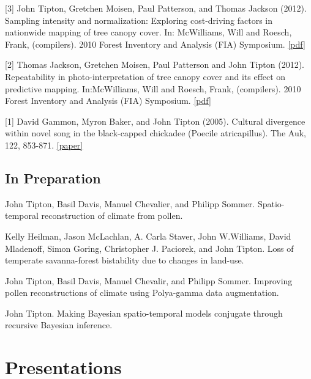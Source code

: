 \documentclass[11pt,]{article}
\renewenvironment{itemize}{
  \begin{list}{}{
    \setlength{\leftmargin}{1.5em}
  }
}{
  \end{list}
}
\begin{document}
\begin{itemize}
\item
  {[}3{]} John Tipton, Gretchen Moisen, Paul Patterson, and Thomas
  Jackson (2012). Sampling intensity and normalization: Exploring
  cost-driving factors in nationwide mapping of tree canopy cover. In:
  McWilliams, Will and Roesch, Frank, (compilers). 2010 Forest Inventory
  and Analysis (FIA) Symposium.
  \href{https://www.srs.fs.fed.us/pubs/gtr/gtr_srs157/gtr_srs157_201.pdf}{{[}pdf{]}}
\item
  {[}2{]} Thomas Jackson, Gretchen Moisen, Paul Patterson and John
  Tipton (2012). Repeatability in photo-interpretation of tree canopy
  cover and its effect on predictive mapping. In:McWilliams, Will and
  Roesch, Frank, (compilers). 2010 Forest Inventory and Analysis (FIA)
  Symposium.
  \href{https://www.srs.fs.fed.us/pubs/gtr/gtr_srs157/gtr_srs157_189.pdf}{{[}pdf{]}}
\item
  {[}1{]} David Gammon, Myron Baker, and John Tipton (2005). Cultural
  divergence within novel song in the black-capped chickadee (Poecile
  atricapillus). The Auk, 122, 853-871.
  \href{http://www.bioone.org/doi/abs/10.1642/0004-8038\%282005\%29122\%5B0853\%3ACDWNSI\%5D2.0.CO\%3B2}{{[}paper{]}}
\end{itemize}

\hypertarget{in-preparation}{%
\subsection{In Preparation}\label{in-preparation}}

\begin{itemize}
\item
  John Tipton, Basil Davis, Manuel Chevalier, and Philipp Sommer.
  Spatio-temporal reconstruction of climate from pollen.
\item
  Kelly Heilman, Jason McLachlan, A. Carla Staver, John W.Williams,
  David Mladenoff, Simon Goring, Christopher J. Paciorek, and John
  Tipton. Loss of temperate savanna-forest bistability due to changes in
  land-use.
\item
  John Tipton, Basil Davis, Manuel Chevalir, and Philipp Sommer.
  Improving pollen reconstructions of climate using Polya-gamma data
  augmentation.
\item
  John Tipton. Making Bayesian spatio-temporal models conjugate through
  recursive Bayesian inference.
\end{itemize}

\hypertarget{presentations}{%
\section{Presentations}\label{presentations}}
\end{document}
